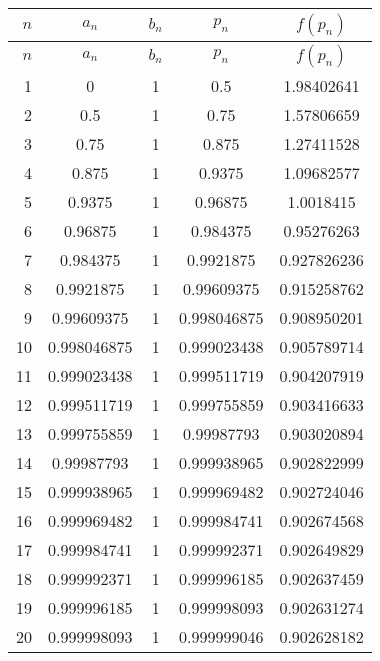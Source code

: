 \documentclass[../../../../Assignments.tex]{subfiles}
\begin{document}
\begin{solution}
\begin{enumerate}[label = (\alph*)]
            \begin{longtable}{r S[table-format=1.9] S[table-format=1] S[table-format=1.9] S[table-format=1.9]}
                \toprule
                \(n\)  &   {\(a_n\)}   &  {\(b_n\)}  &   {\(p_n\)}   &  {\(f(p_n)\)}  \\
                \midrule
                \endfirsthead
                \(n\)  &   {\(a_n\)}   &  {\(b_n\)}  &   {\(p_n\)}   &  {\(f(p_n)\)}  \\
                \midrule
                  &  0            &  1          &  0.5          &  1.98402641    \\
                    2  &  0.5          &  1          &  0.75         &  1.57806659    \\
                    3  &  0.75         &  1          &  0.875        &  1.27411528    \\
                    4  &  0.875        &  1          &  0.9375       &  1.09682577    \\
                    5  &  0.9375       &  1          &  0.96875      &  1.0018415     \\
                    6  &  0.96875      &  1          &  0.984375     &  0.95276263    \\
                    7  &  0.984375     &  1          &  0.9921875    &  0.927826236   \\
                    8  &  0.9921875    &  1          &  0.99609375   &  0.915258762   \\
                    9  &  0.99609375   &  1          &  0.998046875  &  0.908950201   \\
                   10  &  0.998046875  &  1          &  0.999023438  &  0.905789714   \\
                   11  &  0.999023438  &  1          &  0.999511719  &  0.904207919   \\
                   12  &  0.999511719  &  1          &  0.999755859  &  0.903416633   \\
                   13  &  0.999755859  &  1          &  0.99987793   &  0.903020894   \\
                   14  &  0.99987793   &  1          &  0.999938965  &  0.902822999   \\
                   15  &  0.999938965  &  1          &  0.999969482  &  0.902724046   \\
                   16  &  0.999969482  &  1          &  0.999984741  &  0.902674568   \\
                   17  &  0.999984741  &  1          &  0.999992371  &  0.902649829   \\
                   18  &  0.999992371  &  1          &  0.999996185  &  0.902637459   \\
                   19  &  0.999996185  &  1          &  0.999998093  &  0.902631274   \\
                   20  &  0.999998093  &  1          &  0.999999046  &  0.902628182   \\
                \bottomrule
            \end{longtable}


\end{enumerate}
\end{solution}
\end{document}
